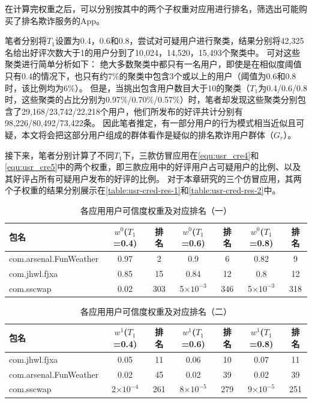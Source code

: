 在计算完权重之后，可以分别按其中的两个子权重对应用进行排名，筛选出可能购买了排名欺诈服务的App。

笔者分别将$T_1$设置为0.4，0.6和0.8，尝试对可疑用户进行聚类，结果分别将42,325名给出好评次数大于1的用户分到了10,024，14,520，15,493个聚类中。
可对这些聚类进行简单分析如下：
绝大多数聚类中都只有一名用户，即使是在相似度阈值只有0.4的情况下，也只有约7\%的聚类中包含3个或以上的用户（阈值为0.6和0.8时，该比例均为6\%）。
但是，当挑出包含用户数目大于10的聚类（$T_1$为0.4/0.6/0.8时，这些聚类的占比分别为0.97\%/0.70\%/0.57\%）时，笔者却发现这些聚类分别包含了29,168/23,742/22,218个用户，他们所发布的好评共计分别有98,226/80,492/73,422条。
因此笔者推定，有一部分用户的行为模式相当近似且可疑，本文将会把这部分用户组成的群体看作是疑似的排名欺诈用户群体（$G_r$）。

接下来，笔者分别计算了不同$T_1$下，三款仿冒应用在\autoref{equ:usr_cre4}和\autoref{equ:usr_cre5}中的两个权重，即三款应用中的好评用户占可疑用户的比例、以及其好评占所有可疑用户发布的好评的比例。
对于本章研究的三个仿冒应用，其两个子权重的结果分别展示在\autoref{table:usr-cred-res-1}和\autoref{table:usr-cred-res-2}中。

\begin{table}[htbp]
	\renewcommand{\arraystretch}{1}
	\small
	\centering
	\caption{各应用用户可信度权重及对应排名（一）}
	\vspace{1mm}
	\begin{tabular}{lcccccc}
		\toprule
		包名 & $w^0$($T_1$=0.4) & 排名 & $w^0$($T_1$=0.6) & 排名 & $w^0$($T_1$=0.8) & 排名 \\
		\midrule
		com.arsenal.FunWeather & 0.97 & 2 & 0.9 & 6 & 0.82 & 9 \\
		\rowcolor{gray!15} com.jhwl.fjxa & 0.85 & 15 & 0.84 & 12 & 0.8 & 12 \\
		com.sscwap & 0.02 & 303 & 5$\times10^{-3}$ & 346 & 5$\times10^{-3}$ & 318 \\
		\bottomrule
	\end{tabular}
	\label{table:usr-cred-res-1}
\end{table}

\begin{table}[htbp]
	\renewcommand{\arraystretch}{1}
	\small
	\centering
	\caption{各应用用户可信度权重及对应排名（二）}
	\vspace{1mm}
	\begin{tabular}{lcccccc}
		\toprule
		包名 & $w^1$($T_1$=0.4) & 排名 & $w^1$($T_1$=0.6) & 排名 & $w^1$($T_1$=0.8) & 排名 \\
		\midrule
		com.jhwl.fjxa & 0.05 & 11 & 0.06 & 10 & 0.07 & 11 \\
		\rowcolor{gray!15} com.arsenal.FunWeather & 0.02 & 45 & 0.02 & 39 & 0.02 & 39 \\
		com.sscwap & 2$\times10^{-4}$ & 261 & 8$\times10^{-5}$ & 279 & 9$\times10^{-5}$ & 251 \\
		\bottomrule
	\end{tabular}
	\label{table:usr-cred-res-2}
\end{table}

